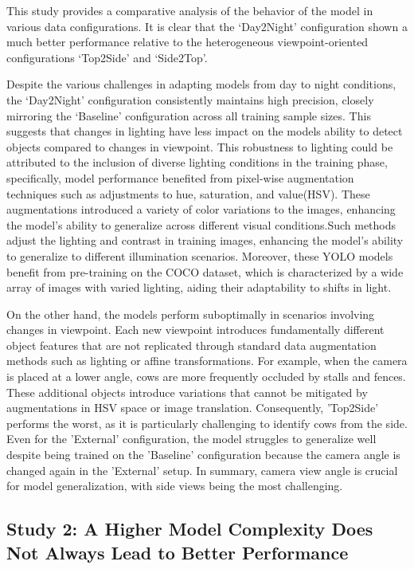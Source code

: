 This study  provides a comparative analysis of the behavior of the model in various data configurations. It is clear that the `Day2Night' configuration shown a much better performance relative to the heterogeneous viewpoint-oriented configurations `Top2Side' and `Side2Top'.

Despite the various challenges in adapting models from day to night conditions, the `Day2Night' configuration consistently maintains high precision, closely mirroring the `Baseline' configuration across all training sample sizes. This suggests that changes in lighting have less impact on the models ability to detect objects compared to changes in viewpoint. This robustness to lighting could be attributed to the inclusion of diverse lighting conditions in the training phase, specifically, model performance benefited from pixel-wise augmentation techniques such as adjustments to hue, saturation, and value(HSV). These augmentations introduced a variety of color variations to the images, enhancing the model's ability to generalize across different visual conditions.Such methods adjust the lighting and contrast in training images, enhancing the model's ability to generalize to different illumination scenarios. Moreover, these YOLO models benefit from pre-training on the COCO dataset, which is characterized by a wide array of images with varied lighting, aiding their adaptability to shifts in light.

On the other hand, the models perform suboptimally in scenarios involving changes in viewpoint. Each new viewpoint introduces fundamentally different object features that are not replicated through standard data augmentation methods such as lighting or affine transformations. For example, when the camera is placed at a lower angle, cows are more frequently occluded by stalls and fences. These additional objects introduce variations that cannot be mitigated by augmentations in HSV space or image translation. Consequently, 'Top2Side' performs the worst, as it is particularly challenging to identify cows from the side. Even for the 'External' configuration, the model struggles to generalize well despite being trained on the 'Baseline' configuration because the camera angle is changed again in the 'External' setup. In summary, camera view angle is crucial for model generalization, with side views being the most challenging.




\subsection*{Study 2: A Higher Model Complexity Does Not Always Lead to Better Performance}

